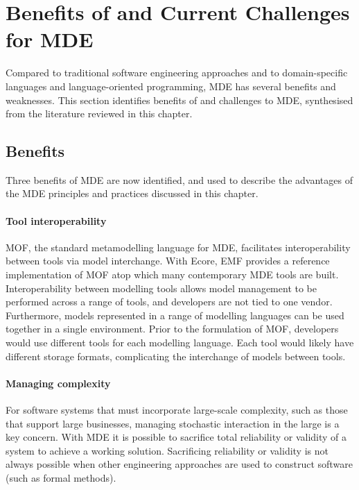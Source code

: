 
\section{Benefits of and Current Challenges for MDE}
\label{sec:mde_benefits_and_challenges}
Compared to traditional software engineering approaches and to domain-specific languages and language-oriented programming, MDE has several benefits and weaknesses. This section identifies benefits of and challenges to MDE, synthesised from the literature reviewed in this chapter.

\subsection{Benefits}
\label{subsec:mde_benefits}
Three benefits of MDE are now identified, and used to describe the advantages of the MDE principles and practices discussed in this chapter. 

\paragraph{Tool interoperability} MOF, the standard metamodelling language for MDE, facilitates interoperability between tools via model interchange. With Ecore, EMF provides a reference implementation of MOF atop which many contemporary MDE tools are built. Interoperability between modelling tools allows model management to be performed across a range of tools, and developers are not tied to one vendor. Furthermore, models represented in a range of modelling languages can be used together in a single environment. Prior to the formulation of MOF, developers would use different tools for each modelling language. Each tool would likely have different storage formats, complicating the interchange of models between tools.

\paragraph{Managing complexity} For software systems that must incorporate large-scale complexity, such as those that support large businesses, managing stochastic interaction in the large is a key concern. With MDE it is possible to sacrifice total reliability or validity of a system to achieve a working solution. Sacrificing reliability or validity is not always possible when other engineering approaches are used to construct software (such as formal methods).  

